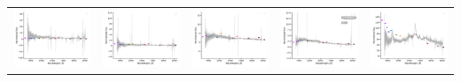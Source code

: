 \begin{center}
\begin{longtable}{l l l l l }
    \includegraphics[width=0.19\linewidth, clip]{Figs/Figs-lamost/spec-58078-EG224242N000415M01_sp08-004-SPLUS-s02s13-032892.pdf} & \includegraphics[width=0.19\linewidth, clip]{Figs/Figs-lamost/spec-58078-EG224242N000415M01_sp10-165-STRIPE82-0141-015370.pdf} & \includegraphics[width=0.19\linewidth, clip]{Figs/Figs-lamost/spec-58080-S82013N00M1_sp03-057-STRIPE82-0019-043090.pdf} & \includegraphics[width=0.19\linewidth, clip]{Figs/Figs-lamost/spec-58080-S82013N00M1_sp05-163-STRIPE82-0021-026890.pdf} & \includegraphics[width=0.19\linewidth, clip]{Figs/Figs-lamost/spec-58138-S82048N00B1_sp16-083-STRIPE82-0068-063428.pdf} \\
  \end{longtable}
\end{center}
